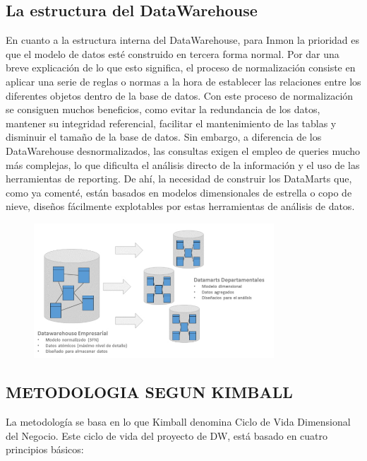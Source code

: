 \documentclass[%
 reprint,
 amsmath,amssymb,
 aps,
]{revtex4-1}
\begin{document}
\subsection{La estructura del DataWarehouse}	
En cuanto a la estructura interna del DataWarehouse, para Inmon la prioridad es que el modelo de datos esté construido en tercera forma normal. Por dar una breve explicación de lo que esto significa, el proceso de normalización consiste en aplicar una serie de reglas o normas a la hora de establecer las relaciones entre los diferentes objetos dentro de la base de datos. Con este proceso de normalización se consiguen muchos beneficios, como evitar la redundancia de los datos, mantener su integridad referencial, facilitar el mantenimiento de las tablas y disminuir el tamaño de la base de datos. Sin embargo, a diferencia de los DataWarehouse desnormalizados, las consultas exigen el empleo de queries mucho más complejas, lo que dificulta el análisis directo de la información y el uso de las herramientas de reporting. De ahí, la necesidad de construir los DataMarts que, como ya comenté, están basados en modelos dimensionales de estrella o copo de nieve, diseños fácilmente explotables por estas herramientas de análisis de datos.\cite{estrella3}

			\begin{figure}[htb]
				\begin{center}
					\includegraphics[width=9cm]{./IMAGENES/imgleydi3}
				\end{center}
			\end{figure}
\subsection{METODOLOGIA SEGUN KIMBALL}	
La metodología se basa en lo que Kimball denomina Ciclo de Vida Dimensional del Negocio. Este ciclo de vida del proyecto de DW, está basado en cuatro principios básicos: 
\end{document}
